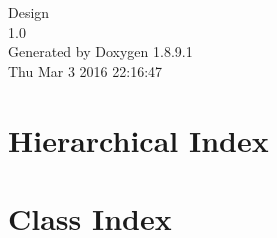 \documentclass[twoside]{book}
\newcommand{\+}{\discretionary{\mbox{\scriptsize$\hookleftarrow$}}{}{}}
\newcommand{\clearemptydoublepage}{%
  \newpage{\pagestyle{empty}\cleardoublepage}%
}
\begin{document}
\hypersetup{pageanchor=false,
             bookmarks=true,
             bookmarksnumbered=true,
             pdfencoding=unicode
            }
\begin{titlepage}
\vspace*{7cm}
\begin{center}%
{\Large Design \\[1ex]\large 1.\+0 }\\
\vspace*{1cm}
{\large Generated by Doxygen 1.8.9.1}\\
\vspace*{0.5cm}
{\small Thu Mar 3 2016 22:16:47}\\
\end{center}
\end{titlepage}
\tableofcontents
{}
\hypersetup{pageanchor=true}

%
\chapter{Hierarchical Index}

\chapter{Class Index}

%
%
%
%
%
%
%
%
%
%
\end{document}
